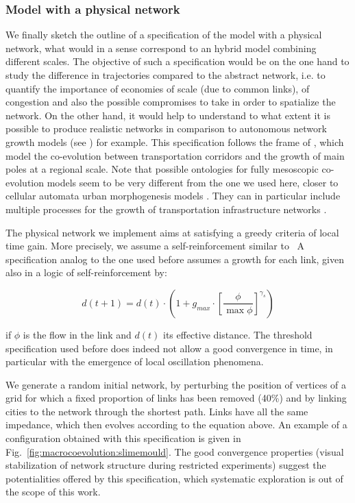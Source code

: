 \documentclass[11pt]{article}
\begin{document}
\subsubsection{Model with a physical network}


We finally sketch the outline of a specification of the model with a physical network, what would in a sense correspond to an hybrid model combining different scales. The objective of such a specification would be on the one hand to study the difference in trajectories compared to the abstract network, i.e. to quantify the importance of economies of scale (due to common links), of congestion and also the possible compromises to take in order to spatialize the network. On the other hand, it would help to understand to what extent it is possible to produce realistic networks in comparison to autonomous network growth models (see \cite{xie2009modeling}) for example. This specification follows the frame of \cite{li2014modeling}, which model the co-evolution between transportation corridors and the growth of main poles at a regional scale. Note that possible ontologies for fully mesoscopic co-evolution models seem to be very different from the one we used here, closer to cellular automata urban morphogenesis models \citep{2018arXiv180505195R}. They can in particular include multiple processes for the growth of transportation infrastructure networks \citep{raimbault2018multi}.




The physical network we implement aims at satisfying a greedy criteria of local time gain. More precisely, we assume a self-reinforcement similar to~\cite{tero2010rules} A specification analog to the one used before assumes a growth for each link, given also in a logic of self-reinforcement by:

\[
d(t+1) = d(t)\cdot \left(1 + g_{max} \cdot \left[\frac{\phi}{\max \phi}\right]^{\gamma_s}\right)
\]

if $\phi$ is the flow in the link and $d(t)$ its effective distance. The threshold specification used before does indeed not allow a good convergence in time, in particular with the emergence of local oscillation phenomena.

We generate a random initial network, by perturbing the position of vertices of a grid for which a fixed proportion of links has been removed (40\%) and by linking cities to the network through the shortest path. Links have all the same impedance, which then evolves according to the equation above. An example of a configuration obtained with this specification is given in Fig.~\ref{fig:macrocoevolution:slimemould}. The good convergence properties (visual stabilization of network structure during restricted experiments) suggest the potentialities offered by this specification, which systematic exploration is out of the scope of this work.
\end{document}
